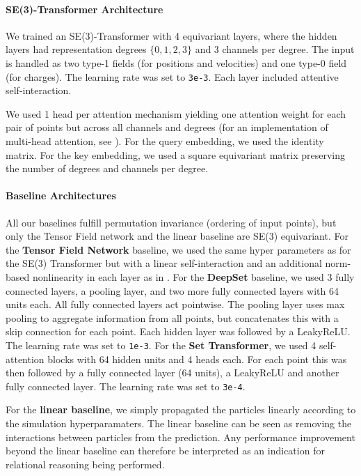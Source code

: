 \paragraph{SE(3)-Transformer Architecture}
We trained an SE(3)-Transformer with 4 equivariant layers, where the hidden layers had representation degrees $\{0,1,2,3\}$ and 3 channels per degree. The input is handled as two type-1 fields (for positions and velocities) and one type-0 field (for charges). The learning rate was set to \texttt{3e-3}. Each layer included attentive self-interaction.

We used 1 head per attention mechanism yielding one attention weight for each pair of points but across all channels and degrees (for an implementation of multi-head attention, see ). For the query embedding, we used the identity matrix. For the key embedding, we used a square equivariant matrix preserving the number of degrees and channels per degree.

\paragraph{Baseline Architectures}
All our baselines fulfill permutation invariance (ordering of input points), but only the Tensor Field network and the linear baseline are SE(3) equivariant. For the \textbf{Tensor Field Network}\cite{ThomasSKYKR18} baseline, we used the same hyper parameters as for the SE(3) Transformer but with a linear self-interaction and an additional norm-based nonlinearity in each layer as in \citet{ThomasSKYKR18}. For the \textbf{DeepSet}\cite{Zaheer2017} baseline, we used 3 fully connected layers, a pooling layer, and two more fully connected layers with 64 units each. All fully connected layers act pointwise. The pooling layer uses max pooling to aggregate information from all points, but concatenates this with a skip connection for each point. Each hidden layer was followed by a LeakyReLU. The learning rate was set to \texttt{1e-3}. For the \textbf{Set Transformer}\cite{SetTransformer}, we used 4 self-attention blocks with 64 hidden units and 4 heads each. For each point this was then followed by a fully connected layer (64 units), a LeakyReLU and another fully connected layer. The learning rate was set to \texttt{3e-4}.

For the \textbf{linear baseline}, we simply propagated the particles linearly according to the simulation hyperparamaters. The linear baseline can be seen as removing the interactions between particles from the prediction. Any performance improvement beyond the linear baseline can therefore be interpreted as an indication for relational reasoning being performed.



